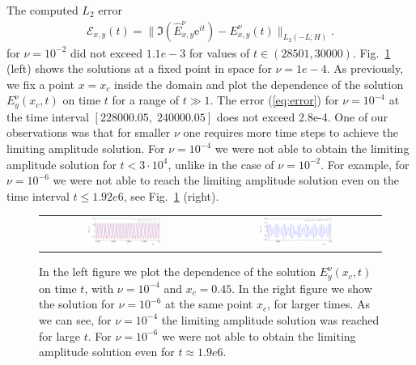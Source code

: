 \FloatBarrier
The computed $L_2$ error
\begin{align}
\label{eq:error}
\mathcal{E}_{x,y}(t)=\|\Im\left(\hat{E}_{x,y}^{\nu}\mathrm{e}^{it}\right)-E_{x,y}^{\nu}(t)\|_{L_{2}(-L;H)}.
\end{align}
for $\nu=10^{-2}$ did not exceed $1.1e-3$ for values of $t\in \left(28501,  30000\right)$. Fig.~\ref{fig:nu1e4_harmon} (left) shows the solutions at a fixed point in space for $\nu=1e-4$. As previously, 
 we fix a point $x=x_c$ inside the domain and plot 
the dependence of the solution $E_{y}^{\nu}(x_c,t)$ on time $t$ for a range of $t\gg 1$. 
The error (\ref{eq:error}) for $\nu=10^{-4}$ at the time interval $[228000.05,\; 240000.05]$ does not exceed 2.8e-4. 
One of our observations was that for smaller $\nu$ one requires more time steps to achieve the limiting amplitude solution. 
For $\nu=10^{-4}$ we were not able to obtain the limiting amplitude solution for $t<3\cdot 10^{4}$, unlike in the case of $\nu=10^{-2}$. 
For example, for $\nu=10^{-6}$ we were not able to reach the limiting amplitude solution even on the time interval $t\leq 1.92e6$, 
see Fig.~\ref{fig:nu1e4_harmon} (right). 
\begin{figure}
\begin{tabular}{cc}
 \includegraphics[width=0.45\textwidth]{pics_time_domain/airy/figure_nu1e4-crop.pdf}&
 \includegraphics[width=0.45\textwidth]{pics_time_domain/airy/figure_nu1e6-crop.pdf}\\
\end{tabular}
\caption{In the left figure we plot the dependence of the solution $E_{y}^{\nu}(x_c,t)$ on time $t$, with $\nu=10^{-4}$ and $x_c=0.45$. 
In the right figure we show the solution for $\nu=10^{-6}$ at the same point $x_c$, for larger times. As we can see, for 
$\nu=10^{-4}$ the limiting amplitude solution was reached for large $t$. For $\nu=10^{-6}$ we were not able 
to obtain the limiting amplitude solution even for $t\approx 1.9e6$. }
  \label{fig:nu1e4_harmon}
\end{figure}

